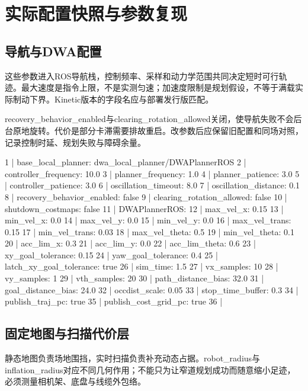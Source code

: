 \section{实际配置快照与参数复现}
\subsection{导航与DWA配置}
这些参数进入ROS导航栈，控制频率、采样和动力学范围共同决定短时可行轨迹。最大速度是指令上限，不是实测匀速；加速度限制是规划假设，不等于满载实际制动下界。Kinetic版本的字段名应与部署发行版匹配。

recovery\_behavior\_enabled与clearing\_rotation\_allowed关闭，使导航失败不会后台原地旋转。代价是部分卡滞需要排故重启。改参数后应保留旧配置和同场对照，记录控制时延、规划失败与障碍余量。
\begin{CodeBlock}
  1 | base_local_planner: dwa_local_planner/DWAPlannerROS
  2 | controller_frequency: 10.0
  3 | planner_frequency: 1.0
  4 | planner_patience: 3.0
  5 | controller_patience: 3.0
  6 | oscillation_timeout: 8.0
  7 | oscillation_distance: 0.1
  8 | recovery_behavior_enabled: false
  9 | clearing_rotation_allowed: false
 10 | shutdown_costmaps: false
 11 | DWAPlannerROS:
 12 |   max_vel_x: 0.15
 13 |   min_vel_x: 0.0
 14 |   max_vel_y: 0.0
 15 |   min_vel_y: 0.0
 16 |   max_vel_trans: 0.15
 17 |   min_vel_trans: 0.03
 18 |   max_vel_theta: 0.5
 19 |   min_vel_theta: 0.1
 20 |   acc_lim_x: 0.3
 21 |   acc_lim_y: 0.0
 22 |   acc_lim_theta: 0.6
 23 |   xy_goal_tolerance: 0.15
 24 |   yaw_goal_tolerance: 0.4
 25 |   latch_xy_goal_tolerance: true
 26 |   sim_time: 1.5
 27 |   vx_samples: 10
 28 |   vy_samples: 1
 29 |   vth_samples: 20
 30 |   path_distance_bias: 32.0
 31 |   goal_distance_bias: 24.0
 32 |   occdist_scale: 0.05
 33 |   stop_time_buffer: 0.3
 34 |   publish_traj_pc: true
 35 |   publish_cost_grid_pc: true
 36 | 
\end{CodeBlock}
\subsection{固定地图与扫描代价层}
静态地图负责场地围挡，实时扫描负责补充动态占据。robot\_radius与inflation\_radius对应不同几何作用；不能只为让窄道规划成功而随意缩小足迹，必须测量相机架、底盘与线缆外包络。

